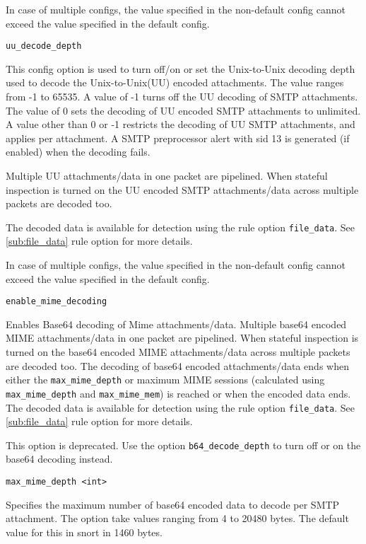 \documentclass[english]{report}
\newcounter{slistnum}
\newenvironment{slist}
{ \begin{list}{ {\bf \arabic{slistnum}.} }{\usecounter{slistnum} } }
{ \end{list} }
\begin{document}
\begin{slist}
In case of multiple configs, the value specified in the non-default config cannot exceed
the value specified in the default config.

\item \texttt{uu\_decode\_depth}

This config option is used to turn off/on or set the Unix-to-Unix decoding depth
used to decode the Unix-to-Unix(UU) encoded attachments. The value ranges
from -1 to 65535. A value of -1 turns off the UU decoding of SMTP attachments.
The value of 0 sets the decoding of UU encoded SMTP attachments to unlimited. A
value other than 0 or -1 restricts the decoding of UU SMTP attachments, and applies 
per attachment. A SMTP preprocessor alert with sid 13 is generated (if enabled) when the decoding fails.

Multiple UU attachments/data in one packet are pipelined. When stateful inspection
is turned on the UU encoded SMTP attachments/data across multiple packets are decoded too.

The decoded data is available for detection using the rule option \texttt{file\_data}.
See \ref{sub:file_data} rule option for more details.

In case of multiple configs, the value specified in the non-default config cannot exceed
the value specified in the default config.

\item \texttt{enable\_mime\_decoding}

Enables Base64 decoding of Mime attachments/data. Multiple base64 encoded MIME
attachments/data in one packet are pipelined. When stateful inspection is turned
on the base64 encoded MIME attachments/data across multiple packets are decoded too.
The decoding of base64 encoded attachments/data ends when either the 
\texttt{max\_mime\_depth} or maximum MIME sessions (calculated using 
\texttt{max\_mime\_depth} and \texttt{max\_mime\_mem}) is reached or when the 
encoded data ends. The decoded data is available for detection using the rule option 
\texttt{file\_data}. See \ref{sub:file_data} rule option for more details.

This option is deprecated. Use the option \texttt{b64\_decode\_depth} to turn off
or on the base64 decoding instead.

\item \texttt{max\_mime\_depth <int>}

Specifies the maximum number of base64 encoded data to decode per SMTP attachment.
The option take values ranging from 4 to 20480 bytes. The default value for this
in snort in 1460 bytes.


\end{slist}
\end{document}
